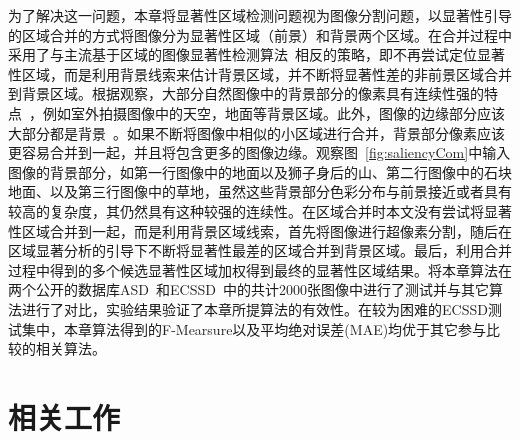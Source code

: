 \par
为了解决这一问题，本章将显著性区域检测问题视为图像分割问题，以显著性引导的区域合并的方式将图像分为显著性区域（前景）和背景两个区域。在合并过程中采用了与主流基于区域的图像显著性检测算法~\cite{Achanta08,ChengPAMI,ufo,Yan2014Hierarchical}相反的策略，即不再尝试定位显著性区域，而是利用背景线索来估计背景区域，并不断将显著性差的非前景区域合并到背景区域。根据观察，大部分自然图像中的背景部分的像素具有连续性强的特点~\cite{huamiao}，例如室外拍摄图像中的天空，地面等背景区域。此外，图像的边缘部分应该大部分都是背景~\cite{backgroundPrior}。如果不断将图像中相似的小区域进行合并，背景部分像素应该更容易合并到一起，并且将包含更多的图像边缘。观察图~\ref{fig:saliencyCom}中输入图像的背景部分，如第一行图像中的地面以及狮子身后的山、第二行图像中的石块地面、以及第三行图像中的草地，虽然这些背景部分色彩分布与前景接近或者具有较高的复杂度，其仍然具有这种较强的连续性。在区域合并时本文没有尝试将显著性区域合并到一起，而是利用背景区域线索，首先将图像进行超像素分割，随后在区域显著分析的引导下不断将显著性最差的区域合并到背景区域。最后，利用合并过程中得到的多个候选显著性区域加权得到最终的显著性区域结果。将本章算法在两个公开的数据库ASD~\cite{Achanta08}和ECSSD~\cite{ECSSD}中的共计2000张图像中进行了测试并与其它算法进行了对比，实验结果验证了本章所提算法的有效性。在较为困难的ECSSD测试集中，本章算法得到的F-Mearsure以及平均绝对误差(MAE)均优于其它参与比较的相关算法。

\section{相关工作}
\label{sec:relatedWorks}
